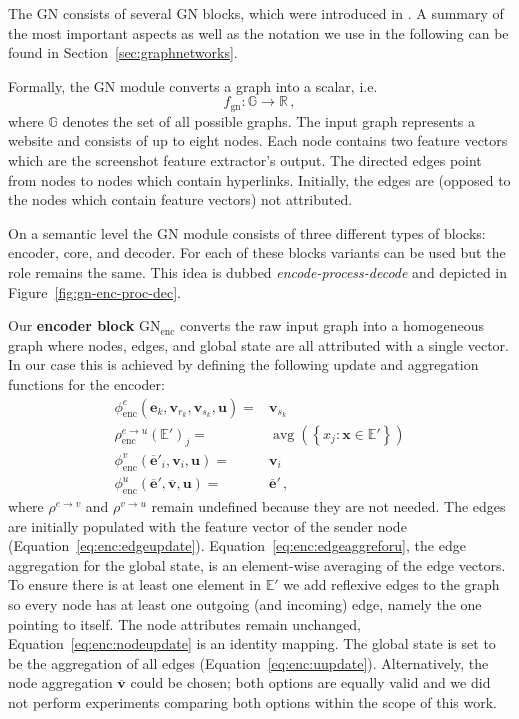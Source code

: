 The GN consists of several GN blocks, which were introduced in \cite{deepmind:graphnets}. A summary of the most important aspects as well as the notation we use in the following can be found in Section~\ref{sec:graphnetworks}.

Formally, the GN module converts a graph into a scalar, i.e. \begin{equation}
    \label{eq:gnmodule}
    f_\text{gn}:\mathbb{G}\rightarrow\mathbb{R}\,,
\end{equation} where $\mathbb{G}$ denotes the set of all possible graphs. The input graph represents a website and consists of up to eight nodes. Each node contains two feature vectors which are the screenshot feature extractor's output. The directed edges point from nodes to nodes which contain hyperlinks. Initially, the edges are (opposed to the nodes which contain feature vectors) not attributed.

On a semantic level the GN module consists of three different types of blocks: encoder, core, and decoder. For each of these blocks variants can be used but the role remains the same. This idea is dubbed \textit{encode-process-decode} and depicted in Figure~\ref{fig:gn-enc-proc-dec}.

Our \textbf{encoder block} $\text{GN}_\text{enc}$ converts the raw input graph into a homogeneous graph where nodes, edges, and global state are all attributed with a single vector. In our case this is achieved by defining the following update and aggregation functions for the encoder:\begin{align}
    \phi^e_\text{enc}\left(\bm{e}_k,\bm{v}_{r_k},\bm{v}_{s_k},\bm{u}\right)=&\bm{v}_{s_k}\label{eq:enc:edgeupdate}\\
    \rho^{e\rightarrow u}_\text{enc}\left(\mathbb{E}'\right)_j=&\operatorname{avg}\left(\left\{x_j:\bm{x}\in\mathbb{E}'\right\}\right)\label{eq:enc:edgeaggreforu}\\
    \phi^v_\text{enc}\left(\bm{\overline{e}}'_i,\bm{v}_i,\bm{u}\right)=&\bm{v}_i\label{eq:enc:nodeupdate}\\
    \phi^u_\text{enc}\left(\bm{\overline{e}}',\bm{\overline{v}},\bm{u}\right)=&\bm{\overline{e}}'\label{eq:enc:uupdate}\,,
\end{align}where $\rho^{e\rightarrow v}$ and $\rho^{v\rightarrow u}$ remain undefined because they are not needed. The edges are initially populated with the feature vector of the sender node (Equation~\ref{eq:enc:edgeupdate}). Equation~\ref{eq:enc:edgeaggreforu}, the edge aggregation for the global state, is an element-wise averaging of the edge vectors. To ensure there is at least one element in $\mathbb{E}'$ we add reflexive edges to the graph so every node has at least one outgoing (and incoming) edge, namely the one pointing to itself. The node attributes remain unchanged, Equation~\ref{eq:enc:nodeupdate} is an identity mapping. The global state is set to be the aggregation of all edges (Equation~\ref{eq:enc:uupdate}). Alternatively, the node aggregation $\bm{\overline{v}}$ could be chosen; both options are equally valid and we did not perform experiments comparing both options within the scope of this work.

